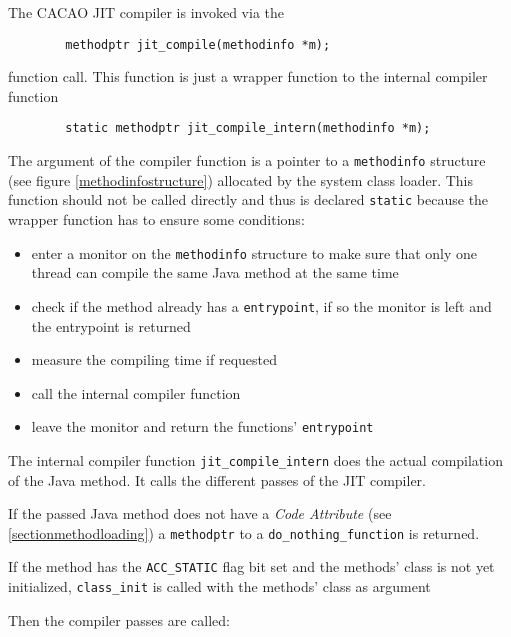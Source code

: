 The CACAO JIT compiler is invoked via the

\begin{verbatim}
        methodptr jit_compile(methodinfo *m);
\end{verbatim}

function call. This function is just a wrapper function to the
internal compiler function

\begin{verbatim}
        static methodptr jit_compile_intern(methodinfo *m);
\end{verbatim}

The argument of the compiler function is a pointer to a
\texttt{methodinfo} structure (see figure \ref{methodinfostructure})
allocated by the system class loader. This function should not be
called directly and thus is declared \texttt{static} because the
wrapper function has to ensure some conditions:

\begin{itemize}
 \item enter a monitor on the \texttt{methodinfo} structure to make
 sure that only one thread can compile the same Java method at the
 same time

 \item check if the method already has a \texttt{entrypoint}, if so
 the monitor is left and the entrypoint is returned

 \item measure the compiling time if requested

 \item call the internal compiler function

 \item leave the monitor and return the functions' \texttt{entrypoint}
\end{itemize}

The internal compiler function \texttt{jit\_compile\_intern} does the
actual compilation of the Java method. It calls the different passes
of the JIT compiler.

If the passed Java method does not have a \textit{Code Attribute} (see
\ref{sectionmethodloading}) a \texttt{methodptr} to a
\texttt{do\_nothing\_function} is returned.

If the method has the \texttt{ACC\_STATIC} flag bit set and the
methods' class is not yet initialized, \texttt{class\_init} is called
with the methods' class as argument

Then the compiler passes are called:

